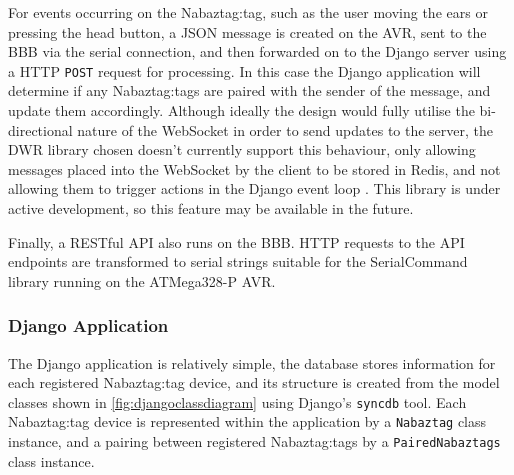 \documentclass[12pt, a4paper]{article}
\begin{document}
	For events occurring on the Nabaztag:tag, such as the user moving the ears or pressing the head button, a \ac{JSON} message is created on the AVR, sent to the \ac{BBB} via the serial connection, and then forwarded on to the Django server using a \ac{HTTP} \verb+POST+ request for processing. In this case the Django application will determine if any Nabaztag:tags are paired with the sender of the message, and update them accordingly. Although ideally the design would fully utilise the bi-directional nature of the WebSocket in order to send updates to the server, the \ac{DWR} library chosen doesn't currently support this behaviour, only allowing messages placed into the WebSocket by the client to be stored in Redis, and not allowing them to trigger actions in the Django event loop \parencite{djangowsredis}. This library is under active development, so this feature may be available in the future.
	
	Finally, a \ac{REST}ful \ac{API} also runs on the \ac{BBB}. \ac{HTTP} requests to the \ac{API} endpoints are transformed to serial strings suitable for the SerialCommand library running on the ATMega328-P AVR.
	
	\subsubsection{Django Application}
	
	The Django application is relatively simple, the database stores information for each registered Nabaztag:tag device, and its structure is created from the model classes shown in \autoref{fig:djangoclassdiagram} using Django's \verb+syncdb+ tool. Each Nabaztag:tag device is represented within the application by a \verb+Nabaztag+ class instance, and a pairing between registered Nabaztag:tags by a \verb+PairedNabaztags+ class instance.
		
\end{document}
